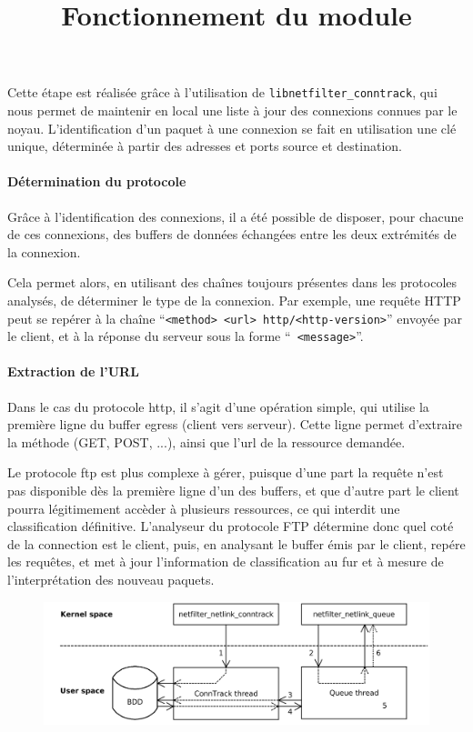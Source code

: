     Cette étape est réalisée grâce à l'utilisation de \verb+libnetfilter_conntrack+, qui nous permet de
    maintenir en local une liste à jour des connexions connues par le noyau. L'identification d'un paquet
    à une connexion se fait en utilisation une clé unique, déterminée à partir des adresses et ports source
    et destination.

  \paragraph{Détermination du protocole}
    Grâce à l'identification des connexions, il a été possible de disposer, pour chacune de ces connexions,
    des buffers de données échangées entre les deux extrémités de la connexion.
    
    Cela permet alors, en utilisant des chaînes toujours présentes dans les protocoles analysés, de déterminer
    le type de la connexion. Par exemple, une requête HTTP peut se repérer à la chaîne ``{\tt <method> <url> http/<http-version>}''
    envoyée par le client, et à la réponse du serveur sous la forme ``{\tt <numerical-code> <message>}''.

  \paragraph{Extraction de l'URL}
    Dans le cas du protocole http, il s'agit d'une opération simple, qui utilise la première ligne du buffer egress (client
    vers serveur). Cette ligne permet d'extraire la méthode (GET, POST, ...), ainsi que l'url de la ressource demandée.
    
    Le protocole ftp est plus complexe à gérer, puisque d'une part la requête n'est pas disponible dès la première ligne d'un des buffers,
    et que d'autre part le client pourra légitimement accèder à plusieurs ressources, ce qui interdit une classification définitive.
    L'analyseur du protocole FTP détermine donc quel coté de la connection est le client, puis, en analysant le buffer émis par le client,
    repére les requêtes, et met à jour l'information de classification au fur et à mesure de l'interprétation des nouveau paquets.
    

  \begin{figure}[h]
    \centering
    \includegraphics[width=\textwidth]{schema2.png}\\
    \title{Fonctionnement du module}
  \end{figure}

